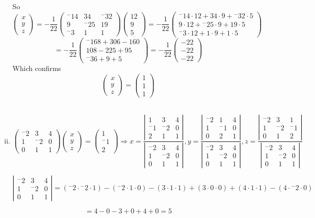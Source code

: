 \documentclass{article}
\def\cramersMatrix#1#2#3#4#5#6#7#8#9{
  \def\a{{#1}}
  \def\b{{#2}}
  \def\c{{#3}}
  \def\d{{#4}}
  \def\e{{#5}}
  \def\f{{#6}}
  \def\g{{#7}}
  \def\h{{#8}}
  \def\i{{#9}}
}
\def\cramersVector#1#2#3{
  \def\j{{#1}}
  \def\k{{#2}}
  \def\l{{#3}}
}
\newcommand{\cramers}[0]
{
\[
	\left(
		\begin{array}{ccc}
			\a & \b & \c \\
			\d & \e & \f \\
			\g & \h & \i
		\end{array}
	\right)
	\left(
		\begin{array}{c}
			x \\
			y \\
			z
		\end{array}
	\right)
	=
	\left(
		\begin{array}{c}
			\j \\
			\k \\
			\l
		\end{array}
	\right)
	\Rightarrow
	x=
	\frac
	{
		\left|
			\begin{array}{ccc}
				\j & \b & \c \\
				\k & \e & \f \\
				\l & \h & \i
			\end{array}
		\right|
	}
	{
		\left|
			\begin{array}{ccc}
				\a & \b & \c \\
				\d & \e & \f \\
				\g & \h & \i
			\end{array}
		\right|
	},
	y=
	\frac
	{
		\left|
			\begin{array}{ccc}
				\a & \j & \c \\
				\d & \k & \f \\
				\g & \l & \i
			\end{array}
		\right|
	}
	{
		\left|
			\begin{array}{ccc}
				\a & \b & \c \\
				\d & \e & \f \\
				\g & \h & \i
			\end{array}
		\right|
	},
	z=
	\frac
	{
		\left|
			\begin{array}{ccc}
				\a & \b & \j \\
				\d & \e & \k \\
				\g & \h & \l
			\end{array}
		\right|
	}
	{
		\left|
			\begin{array}{ccc}
				\a & \b & \c \\
				\d & \e & \f \\
				\g & \h & \i
			\end{array}
		\right|
	}
\]
}
\newcommand{\determinant}[9]
{
\cramersMatrix{#1}{#2}{#3}{#4}{#5}{#6}{#7}{#8}{#9}
\[
	\left|
		\begin{array}{ccc}
			\a & \b & \c \\
			\d & \e & \f \\
			\g & \h & \i
		\end{array}
	\right|
	= (\a \cdot \e \cdot \i) - (\a \cdot \h \cdot \f) - (\b \cdot \d \cdot \i) + (\b \cdot \g \cdot \f) + (\c \cdot \d \cdot \h) - (\c \cdot \e \cdot \g)
\]
}
\begin{document}
\begin{enumerate}
\begin{enumerate}[i.]
So
\[
	\left(
		\begin{array}{c}
			x \\
			y \\
			z
		\end{array}
	\right)
	=
	-\frac{1}{22}
	\left(
		\begin{array}{ccc}
		 {^-}14 &          34 &  {^-}32 \\
		           9 &  {^-}25 &         19  \\
 		    {^-}3 &           1 &           1
		\end{array}	
	\right)
	\left(
		\begin{array}{c}
			12 \\
			9 \\
			5
		\end{array}
	\right)
	=
	-\frac{1}{22}
	\left(
		\begin{array}{c}
			 {^-}14 \cdot 12 +        34 \cdot 9 +  {^-}32 \cdot5 \\
			          9 \cdot 12 + {^-}25 \cdot 9 +         19 \cdot 5 \\
			   {^-}3 \cdot 12 +          1 \cdot 9 +           1 \cdot 5
		\end{array}
	\right)
\]
\[
	=
	-\frac{1}{22}
	\left(
		\begin{array}{c}
			 {^-}168 + 306 - 160 \\
			         108 -  225 + 95 \\
			   {^-} 36+     9 +   5
		\end{array}
	\right)
	=
	-\frac{1}{22}
	\left(
		\begin{array}{c}
			 -22 \\
			 -22 \\
			  -22
		\end{array}
	\right)
\]
Which confirms
\[
	\left(
		\begin{array}{c}
			x \\
			y \\
			z
		\end{array}
	\right)
	=
	\left(
		\begin{array}{c}
			1 \\
			1 \\
			1
		\end{array}
	\right)
\]
\\

\item
\cramersMatrix{{^-}2}{3}{4}{1}{{^-}2}{0}{0}{1}{1}
\cramersVector{1}{{^-}1}{2}
\cramers

\determinant{{^-}2}{3}{4}{1}{{^-}2}{0}{0}{1}{1}
\[
	= 4 - 0 - 3 + 0 + 4 + 0 = 5
\]


\end{enumerate}
\end{enumerate}
\end{document}

